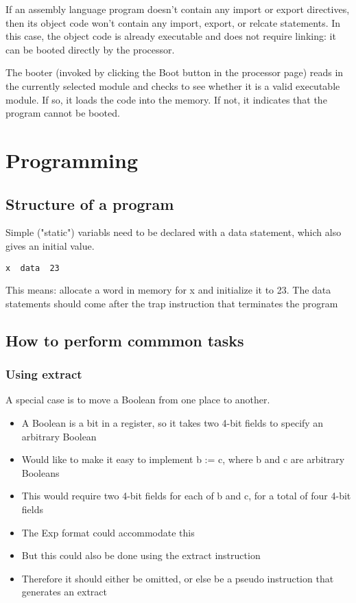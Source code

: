 \documentclass[11pt]{article}
\begin{document}
If an assembly language program doesn't contain any import or export
directives, then its object code won't contain any import, export, or
relcate statements.  In this case, the object code is already
executable and does not require linking: it can be booted directly by
the processor.

The booter (invoked by clicking the Boot button in the processor page)
reads in the currently selected module and checks to see whether it is
a valid executable module.  If so, it loads the code into the memory.
If not, it indicates that the program cannot be booted.

\section*{Programming}
\label{sec:orgd75107a}
\subsection*{Structure of a program}
\label{sec:org6877d8b}

Simple ("static") variabls need to be declared with a data statement,
which also gives an initial value.

\begin{verbatim}
x  data  23
\end{verbatim}

This means: allocate a word in memory for x and initialize it to 23.
The data statements should come after the trap instruction that
terminates the program

\subsection*{How to perform commmon tasks}
\label{sec:org539bea4}

\subsubsection*{Using extract}
\label{sec:orgfad8dd7}
A special case is to move a Boolean from one place to another.
\begin{itemize}
\item A Boolean is a bit in a register, so it takes two 4-bit fields to
specify an arbitrary Boolean
\item Would like to make it easy to implement b := c, where b and c are
arbitrary Booleans
\item This would require two 4-bit fields for each of b and c, for a total
of four 4-bit fields
\item The Exp format could accommodate this
\item But this could also be done using the extract instruction
\item Therefore it should either be omitted, or else be a pseudo
instruction that generates an extract
\end{itemize}
\end{document}
